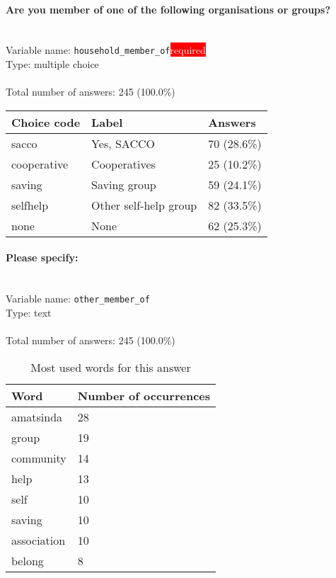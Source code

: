 \documentclass[11.5pt, a4paper]{scrartcl}
\begin{document}
\paragraph{Are you member of one of the following organisations or groups?}
\  \\Variable name: \texttt{household\_member\_of}\hfill\colorbox{red}{\small{\textcolor{white}{required}}}\\
 Type: multiple choice\\
\\Total number of answers: 245 (100.0\%)
\\[0.2em] \begin{tabular}{p{4cm}|p{8cm}|p{3cm}}
Choice code & Label & Answers \\
\hline
sacco & Yes, SACCO& \cellcolor{color1}70 (28.6\%)\\
\cellcolor{mygray} cooperative & \cellcolor{mygray}Cooperatives & \cellcolor{color0}25 (10.2\%)\\
saving & Saving group& \cellcolor{color1}59 (24.1\%)\\
\cellcolor{mygray} selfhelp & \cellcolor{mygray}Other self-help group & \cellcolor{color1}82 (33.5\%)\\
none & None& \cellcolor{color1}62 (25.3\%)\\
\end{tabular}
\paragraph{Please specify:}
\  \\Variable name: \texttt{other\_member\_of}\\
Type: text\\
\\Total number of answers: 245 (100.0\%)
\\[0.2em]\begin{table}[H]
 \begin{tabular}{p{4cm}|p{8cm}}
Word & Number of occurrences  \\
\hline
\cellcolor{mygray}amatsinda&\cellcolor{mygray}28\\
\hline
group&19\\
\hline
\cellcolor{mygray}community&\cellcolor{mygray}14\\
\hline
help&13\\
\hline
\cellcolor{mygray}self&\cellcolor{mygray}10\\
\hline
saving&10\\
\hline
\cellcolor{mygray}association&\cellcolor{mygray}10\\
\hline
belong&8\\
\hline
\end{tabular}
\caption{\label{tab:table-name} Most used words for this answer}
\end{table}
\end{document}
